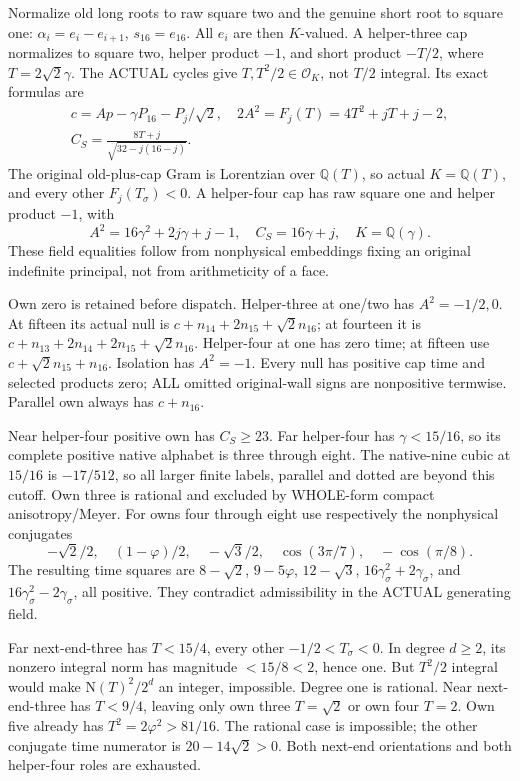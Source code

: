 \documentclass[11pt]{article}
\begin{document}
Normalize old long roots to raw square two and
the genuine short root to square one:
\(\alpha_i=e_i-e_{i+1}\), \(s_{16}=e_{16}\).
All \(e_i\) are then \(K\)-valued.
A helper-three cap normalizes to square two,
helper product \(-1\), and short product \(-T/2\),
where \(T=2\sqrt2\gamma\).
The ACTUAL cycles give
\(T,T^2/2\in\mathcal O_K\), not \(T/2\) integral.
Its exact formulas are
\[
 \begin{gathered}
 c=Ap-\gamma P_{16}-P_j/\sqrt2,\quad
 2A^2=F_j(T)=4T^2+jT+j-2,\\
 C_S={\frac{8T+j}{\sqrt{32-j(16-j)}}} .
 \end{gathered}
\]
The original old-plus-cap Gram is Lorentzian over
\(\mathbb Q(T)\), so actual \(K=\mathbb Q(T)\),
and every other \(F_j(T_\sigma)<0\).
A helper-four cap has raw square one and helper
product \(-1\), with
\[
       A^2=16\gamma^2+2j\gamma+j-1,\quad
       C_S=16\gamma+j,\quad K=\mathbb Q(\gamma).
\]
These field equalities follow from nonphysical
embeddings fixing an original indefinite principal,
not from arithmeticity of a face.

Own zero is retained before dispatch.
Helper-three at one/two has \(A^2=-1/2,0\).
At fifteen its actual null is
\(c+n_{14}+2n_{15}+\sqrt2n_{16}\);
at fourteen it is
\(c+n_{13}+2n_{14}+2n_{15}+\sqrt2n_{16}\).
Helper-four at one has zero time;
at fifteen use \(c+\sqrt2n_{15}+n_{16}\).
Isolation has \(A^2=-1\).
Every null has positive cap time and selected
products zero; ALL omitted original-wall signs
are nonpositive termwise.
Parallel own always has \(c+n_{16}\).

Near helper-four positive own has \(C_S\ge23\).
Far helper-four has \(\gamma<15/16\), so its
complete positive native alphabet is
three through eight.
The native-nine cubic at \(15/16\) is
\(-17/512\), so all larger finite labels, parallel
and dotted are beyond this cutoff.
Own three is rational and excluded by WHOLE-form
compact anisotropy/Meyer.
For owns four through eight use respectively
the nonphysical conjugates
\[
 -\sqrt2/2,\quad(1-\varphi)/2,\quad-\sqrt3/2,\quad
 \cos(3\pi/7),\quad-\cos(\pi/8).
\]
The resulting time squares are
\(8-\sqrt2\), \(9-5\varphi\), \(12-\sqrt3\),
\(16\gamma_\sigma^2+2\gamma_\sigma\), and
\(16\gamma_\sigma^2-2\gamma_\sigma\), all positive.
They contradict admissibility in the ACTUAL
generating field.

Far next-end-three has
\(T<15/4\), every other \(-1/2<T_\sigma<0\).
In degree \(d\ge2\), its nonzero integral norm
has magnitude \(<15/8<2\), hence one.
But \(T^2/2\) integral would make
\(\mathrm N(T)^2/2^d\) an integer, impossible.
Degree one is rational.
Near next-end-three has \(T<9/4\), leaving only
own three \(T=\sqrt2\) or own four \(T=2\).
Own five already has \(T^2=2\varphi^2>81/16\).
The rational case is impossible; the other
conjugate time numerator is \(20-14\sqrt2>0\).
Both next-end orientations and both helper-four
roles are exhausted.
\end{document}
